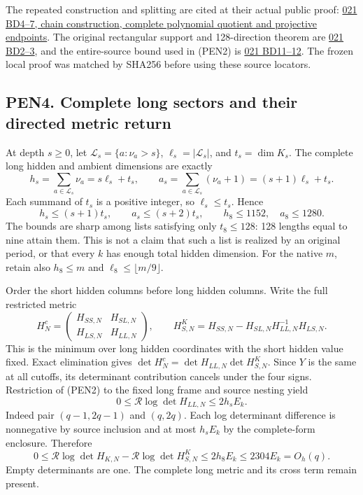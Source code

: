 \documentclass[11pt]{article}
\begin{document}
The repeated construction and splitting are cited at their actual public proof: \href{https://github.com/KokunoYumeto/zeta-function-research-reader/blob/e40b46fde72c245dd79ef5691f59c21d6cbf0c75/workbenches/splitzero-tandem/continuations/20260922-original-observation-recovery/BOUNDED_DEGREE_PROOFS.md\#L84}{021 BD4--7, chain construction, complete polynomial quotient and projective endpoints}. The original rectangular support and 128-direction theorem are \href{https://github.com/KokunoYumeto/zeta-function-research-reader/blob/e40b46fde72c245dd79ef5691f59c21d6cbf0c75/workbenches/splitzero-tandem/continuations/20260922-original-observation-recovery/BOUNDED_DEGREE_PROOFS.md\#L33}{021 BD2--3}, and the entire-source bound used in (PEN2) is \href{https://github.com/KokunoYumeto/zeta-function-research-reader/blob/e40b46fde72c245dd79ef5691f59c21d6cbf0c75/workbenches/splitzero-tandem/continuations/20260922-original-observation-recovery/BOUNDED_DEGREE_PROOFS.md\#L241}{021 BD11--12}. The frozen local proof was matched by SHA256 before using these source locators.

\subsection{PEN4. Complete long sectors and their directed metric return}\label{pen4.-complete-long-sectors-and-their-directed-metric-return}

At depth \(s\ge0\), let \(\mathcal L_s=\{a:\nu_a>s\}\), \(\ell_s=|\mathcal L_s|\), and \(t_s=\dim K_s\). The complete long hidden and ambient dimensions are exactly \[
h_s=\sum_{a\in\mathcal L_s}\nu_a=s\ell_s+t_s,\qquad
a_s=\sum_{a\in\mathcal L_s}(\nu_a+1)=(s+1)\ell_s+t_s. \tag{PEN6}
\] Each summand of \(t_s\) is a positive integer, so \(\ell_s\le t_s\). Hence \[
h_s\le(s+1)t_s,\qquad a_s\le(s+2)t_s,\qquad
h_8\le1152,\quad a_8\le1280.
\] The bounds are sharp among lists satisfying only \(t_8\le128\): 128 lengths equal to nine attain them. This is not a claim that such a list is realized by an original period, or that every \(k\) has enough total hidden dimension. For the native \(m\), retain also \(h_8\le m\) and \(\ell_8\le\lfloor m/9\rfloor\).

Order the short hidden columns before long hidden columns. Write the full restricted metric \[
H_N^c=\begin{pmatrix}H_{SS,N}&H_{SL,N}\\H_{LS,N}&H_{LL,N}\end{pmatrix},
\qquad
H_{S,N}^{K}=H_{SS,N}-H_{SL,N}H_{LL,N}^{-1}H_{LS,N}. \tag{PEN7}
\] This is the minimum over long hidden coordinates with the short hidden value fixed. Exact elimination gives \(\det H_N^c=\det H_{LL,N}\det H_{S,N}^{K}\). Since \(Y\) is the same at all cutoffs, its determinant contribution cancels under the four signs. Restriction of (PEN2) to the fixed long frame and source nesting yield \[
0\le\mathcal R\log\det H_{LL,N}\le2h_sE_k.
\] Indeed pair \((q-1,2q-1)\) and \((q,2q)\). Each log determinant difference is nonnegative by source inclusion and at most \(h_sE_k\) by the complete-form enclosure. Therefore \[
0\le \mathcal R\log\det H_{K,N}
-\mathcal R\log\det H_{S,N}^{K}
\le2h_8E_k\le2304E_k=O_h(q). \tag{PEN8}
\] Empty determinants are one. The complete long metric and its cross term remain present.
\end{document}
